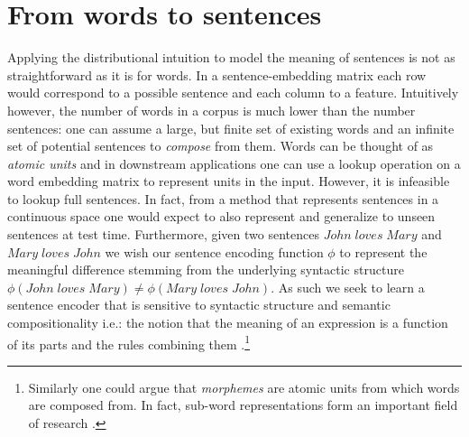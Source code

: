 \section{From words to sentences}
\label{sec:sentences}
Applying the distributional intuition to model the meaning of sentences is not as straightforward
as it is for words. In a sentence-embedding matrix each row
would correspond to a possible sentence and each column to a feature.
Intuitively however,  the number of words in a corpus is much
lower than the number sentences: one can assume a large, but finite set
of existing words and an infinite set of
potential sentences to \emph{compose} from them.
Words can be thought of as \emph{atomic units} and
in downstream applications one can use a lookup operation on a word embedding matrix
to represent units in the input. However, it is infeasible to lookup full sentences.
In fact, from a method that represents sentences in a continuous space one would expect
to also represent and generalize to unseen sentences at test time.
Furthermore, given two sentences $\mathit{John \; loves \; Mary}$ and
$\mathit{Mary \; loves \; John}$ we wish our sentence encoding function
$\phi$ to represent the meaningful difference stemming from the underlying syntactic structure
$\phi(\mathit{John \; loves \; Mary}) \neq \phi(\mathit{Mary \; loves \; John})$.
As such we seek to learn a sentence encoder that is sensitive to
syntactic structure and semantic compositionality i.e.:
the notion that the meaning of an expression is
a function of its parts and the rules combining them \citep{montague1970english}.\footnote{Similarly one could argue that \emph{morphemes} are atomic units from which words are composed from. In fact, sub-word
representations form an important field of research \citep{bojanowski2017enriching}.}

